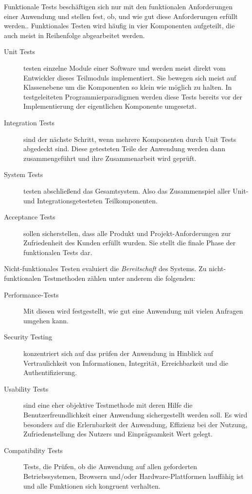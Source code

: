 \documentclass[12pt,a4paper,bibliography=totocnumbered,listof=totocnumbered]{scrartcl}
\begin{document}
Funktionale Tests beschäftigen sich nur mit den funktionalen Anforderungen einer Anwendung und stellen fest, ob, und wie gut diese Anforderungen erfüllt werden.\cite{erikssontesting}. Funktionales Testen wird häufig in vier Komponenten aufgeteilt, die auch meist in Reihenfolge abgearbeitet werden.\cite{inflectra}

\begin{description}
	\item[Unit Tests] testen einzelne Module einer Software und werden meist direkt vom Entwickler dieses Teilmoduls implementiert. Sie bewegen sich meist auf Klassenebene um die Komponenten so klein  wie möglich zu halten. In testgeleiteten Programmierparadigmen werden diese Tests bereits vor der Implementierung der eigentlichen Komponente umgesetzt.\cite{inflectra}
	\item[Integration Tests] sind der nächste Schritt, wenn mehrere Komponenten durch Unit Tests abgedeckt sind. Diese getesteten Teile der Anwendung werden dann zusammengeführt und ihre Zusammenarbeit wird geprüft.\cite{inflectra}
	\item[System Tests] testen abschließend das Gesamtsystem. Also das Zusammenspiel aller Unit- und Integrationsgetesteten Teilkomponenten.\cite{inflectra}
	\item[Acceptance Tests] sollen sicherstellen, dass alle Produkt und Projekt-Anforderungen zur Zufriedenheit des Kunden erfüllt wurden. Sie stellt die finale Phase der funktionalen Tests dar.\cite{inflectra}
\end{description}


Nicht-funktionales Testen evaluiert die \textit{Bereitschaft} des Systems.\cite{erikssontesting} Zu nicht-funktionalen Testmethoden zählen unter anderem die folgenden\cite{inflectra}:

\begin{description}
	\item[Performance-Tests] Mit diesen wird festgestellt, wie gut eine Anwendung mit vielen Anfragen umgehen kann.
	\item[Security Testing] konzentriert sich auf das prüfen der Anwendung in Hinblick auf Vertraulichkeit von Informationen, Integrität, Erreichbarkeit und die Authentifizierung.
	\item[Usability Tests] sind eine eher objektive Testmethode mit deren Hilfe die Benutzerfreundlichkeit einer Anwendung sichergestellt werden soll. Es wird besonders auf die Erlernbarkeit der Anwendung, Effizienz bei der Nutzung, Zufriedenstellung des Nutzers und Einprägsamkeit Wert gelegt.
	\item[Compatibility Tests] Tests, die Prüfen, ob die Anwendung auf allen geforderten Betriebssystemen, Browsern und/oder Hardware-Plattformen lauffähig ist und alle Funktionen sich kongruent verhalten.
\end{description} 
\end{document}
